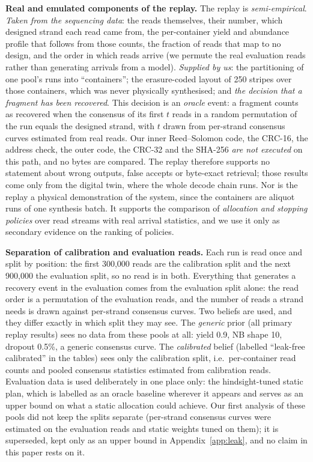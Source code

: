 \documentclass[conference,onecolumn,11pt]{IEEEtran}
\begin{document}
\textbf{Real and emulated components of the replay.}  The replay is \emph{semi-empirical}.
\emph{Taken from the sequencing data}: the reads themselves, their number, which designed strand each
read came from, the per-container yield and abundance profile that follows from those counts, the
fraction of reads that map to no design, and the order in which reads arrive (we permute the real
evaluation reads rather than generating arrivals from a model).  \emph{Supplied by us}: the
partitioning of one pool's runs into ``containers''; the erasure-coded layout of 250 stripes over those
containers, which was never physically synthesised; and \emph{the decision that a fragment has been
recovered}.  This decision is an \emph{oracle} event: a fragment counts as recovered when the consensus
of its first $t$ reads in a random permutation of the run equals the designed strand, with $t$ drawn
from per-strand consensus curves estimated from real reads.  Our inner Reed--Solomon code, the CRC-16,
the address check, the outer code, the CRC-32 and the SHA-256 \emph{are not executed} on this path, and
no bytes are compared.  The replay therefore supports no statement about wrong outputs, false accepts or
byte-exact retrieval; those results come only from the digital twin, where the whole decode chain runs.
Nor is the replay a physical demonstration of the system, since the containers are aliquot runs of one
synthesis batch.  It supports the comparison of \emph{allocation and stopping policies} over read
streams with real arrival statistics, and we use it only as secondary evidence on the ranking of
policies.

\textbf{Separation of calibration and evaluation reads.}  Each run is read once and split by position: the first
300{,}000 reads are the calibration split and the next 900{,}000 the evaluation split, so no read is in
both.  Everything that generates a recovery event in the evaluation comes from the evaluation split
alone: the read order is a permutation of the evaluation reads, and the number of reads a strand needs
is drawn against per-strand consensus curves.  Two beliefs are used, and they differ exactly in which
split they may see.  The \emph{generic} prior (all primary replay results) sees no data from these pools
at all: yield 0.9, NB shape 10, dropout 0.5\%, a generic consensus curve.  The \emph{calibrated}
belief (labelled ``leak-free calibrated'' in the tables) sees only the calibration split, i.e.\
per-container read counts and pooled consensus statistics estimated from calibration reads.  Evaluation
data is used deliberately in one place only: the hindsight-tuned static plan, which is labelled as an
oracle baseline wherever it appears and serves as an upper bound on what a static allocation could
achieve.  Our first analysis of these pools did not keep the splits separate (per-strand consensus
curves were estimated on the evaluation reads and static weights tuned on them); it is superseded, kept
only as an upper bound in Appendix~\ref{app:leak}, and no claim in this paper rests on it.
\end{document}
